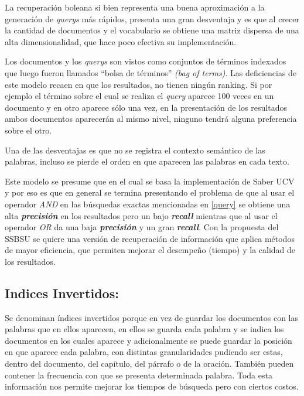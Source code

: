 \documentclass[
  10,
  openany]{book}
\begin{document}
La recuperación boleana si bien representa una buena aproximación a la generación de \emph{querys} más rápidos, presenta una gran desventaja y es que al crecer la cantidad de documentos y el vocabulario se obtiene una matriz dispersa de una alta dimensionalidad, que hace poco efectiva su implementación.

Los documentos y los \emph{querys} son vistos como conjuntos de términos indexados que luego fueron llamados ``bolsa de términos'' \emph{(bag of terms)}. Las deficiencias de este modelo recaen en que los resultados, no tienen ningún ranking. Si por ejemplo el término sobre el cual se realiza el \emph{query} aparece 100 veces en un documento y en otro aparece sólo una vez, en la presentación de los resultados ambos documentos aparecerán al mismo nivel, ninguno tendrá alguna preferencia sobre el otro.

Una de las desventajas es que no se registra el contexto semántico de las palabras, incluso se pierde el orden en que aparecen las palabras en cada texto.

Este modelo se presume que en el cual se basa la implementación de Saber UCV y por eso es que en general se termina presentando el problema de que al usar el operador \emph{AND} en las búsquedas exactas mencionadas en \ref{query} se obtiene una alta \textbf{\emph{precisión}} en los resultados pero un bajo \textbf{\emph{recall}} mientras que al usar el operador \emph{OR} da una baja \textbf{\emph{precisión}} y un gran \textbf{\emph{recall}}.
Con la propuesta del SSBSU se quiere una versión de recuperación de información que aplica métodos de mayor eficiencia, que permiten mejorar el desempeño (tiempo) y la calidad de los resultados.

\hypertarget{indices-invertidos}{%
\subsection{Indices Invertidos:}\label{indices-invertidos}}

Se denominan índices invertidos porque en vez de guardar los documentos con las palabras que en ellos aparecen, en ellos se guarda cada palabra y se indica los documentos en los cuales aparece y adicionalmente se puede guardar la posición en que aparece cada palabra, con distintas granularidades pudiendo ser estas, dentro del documento, del capítulo, del párrafo o de la oración. También pueden contener la frecuencia con que se presenta determinada palabra. Toda esta información nos permite mejorar los tiempos de búsqueda pero con ciertos costos.
\end{document}
